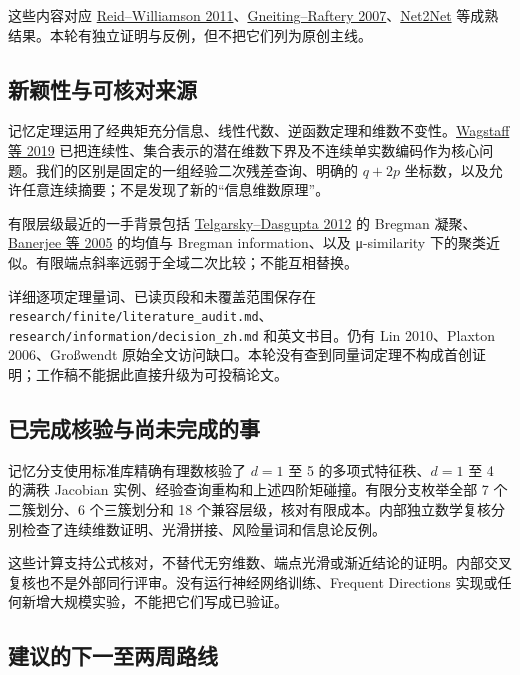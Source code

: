 \documentclass[11pt]{article}
\begin{document}
这些内容对应 \href{https://www.jmlr.org/papers/volume12/reid11a/reid11a.pdf}{Reid--Williamson 2011}、\href{https://sites.stat.washington.edu/raftery/Research/PDF/Gneiting2007jasa.pdf}{Gneiting--Raftery 2007}、\href{https://arxiv.org/abs/1511.05641}{Net2Net} 等成熟结果。本轮有独立证明与反例，但不把它们列为原创主线。

\subsection{新颖性与可核对来源}\label{ux65b0ux9896ux6027ux4e0eux53efux6838ux5bf9ux6765ux6e90}

记忆定理运用了经典矩充分信息、线性代数、逆函数定理和维数不变性。\href{https://proceedings.mlr.press/v97/wagstaff19a.html}{Wagstaff 等 2019} 已把连续性、集合表示的潜在维数下界及不连续单实数编码作为核心问题。我们的区别是固定的一组经验二次残差查询、明确的 \(q+2p\) 坐标数，以及允许任意连续摘要；不是发现了新的``信息维数原理''。

有限层级最近的一手背景包括 \href{https://cseweb.ucsd.edu/~dasgupta/papers/relabreg.pdf}{Telgarsky--Dasgupta 2012} 的 Bregman 凝聚、\href{https://www.jmlr.org/papers/volume6/banerjee05b/banerjee05b.pdf}{Banerjee 等 2005} 的均值与 Bregman information、以及 μ-similarity 下的聚类近似。有限端点斜率远弱于全域二次比较；不能互相替换。

详细逐项定理量词、已读页段和未覆盖范围保存在 \nolinkurl{research/finite/literature_audit.md}、\nolinkurl{research/information/decision_zh.md} 和英文书目。仍有 Lin 2010、Plaxton 2006、Großwendt 原始全文访问缺口。本轮没有查到同量词定理不构成首创证明；工作稿不能据此直接升级为可投稿论文。

\subsection{已完成核验与尚未完成的事}\label{ux5df2ux5b8cux6210ux6838ux9a8cux4e0eux5c1aux672aux5b8cux6210ux7684ux4e8b}

记忆分支使用标准库精确有理数核验了 \(d=1\) 至 5 的多项式特征秩、\(d=1\) 至 4 的满秩 Jacobian 实例、经验查询重构和上述四阶矩碰撞。有限分支枚举全部 7 个二簇划分、6 个三簇划分和 18 个兼容层级，核对有限成本。内部独立数学复核分别检查了连续维数证明、光滑拼接、风险量词和信息论反例。

这些计算支持公式核对，不替代无穷维数、端点光滑或渐近结论的证明。内部交叉复核也不是外部同行评审。没有运行神经网络训练、Frequent Directions 实现或任何新增大规模实验，不能把它们写成已验证。

\subsection{建议的下一至两周路线}\label{ux5efaux8baeux7684ux4e0bux4e00ux81f3ux4e24ux5468ux8defux7ebf}
\end{document}
